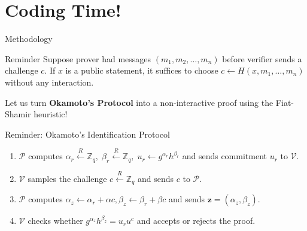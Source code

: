 \documentclass{zkdl-presentation-template}
\begin{document}
    \section{Coding Time!}

    \begin{frame}{Methodology}
        \begin{block}{Reminder}
            Suppose prover had messages $(m_1,m_2,\dots,m_n)$ before verifier sends a challenge $c$. If $x$ is a public statement, it suffices to choose $c \gets H(x,m_1,\dots,m_n)$ without any interaction.
        \end{block}

        Let us turn \textbf{Okamoto's Protocol} into a non-interactive proof using the Fiat-Shamir heuristic!

        \begin{block}{Reminder: Okamoto's Identification Protocol}
            \begin{enumerate}
                \item $\mathcal{P}$ computes $\alpha_r \xleftarrow{R} \mathbb{Z}_q, \; \beta_r \xleftarrow{R} \mathbb{Z}_q, \; u_r \gets g^{\alpha_r}h^{\beta_r}$ and sends commitment $u_r$ to $\mathcal{V}$.
                \item $\mathcal{V}$ samples the challenge $c \xleftarrow{R} \mathbb{Z}_q$ and sends $c$ to $\mathcal{P}$.
                \item $\mathcal{P}$ computes $\alpha_z \gets \alpha_r + \alpha c, \beta_z \gets \beta_r + \beta c$ and sends $\mathbf{z} = (\alpha_z,\beta_z)$.
                \item $\mathcal{V}$ checks whether $g^{\alpha_z}h^{\beta_z} = u_r u^c$ and accepts or rejects the proof.
            \end{enumerate}
        \end{block}
    \end{frame}
\end{document}

